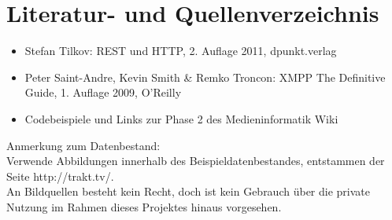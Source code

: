 

\chapter{Literatur- und Quellenverzeichnis}
\begin{itemize}
\item
Stefan Tilkov: REST und HTTP, 2. Auflage 2011, dpunkt.verlag
\item
Peter Saint-Andre, Kevin Smith \& Remko Troncon: XMPP The Definitive Guide, 1. Auflage 2009, O'Reilly
\item
Codebeispiele und Links zur Phase 2 des Medieninformatik Wiki
\end{itemize}

Anmerkung zum Datenbestand:\\
Verwende Abbildungen innerhalb des Beispieldatenbestandes, entstammen der Seite http://trakt.tv/.\\
An Bildquellen besteht kein Recht, doch ist kein Gebrauch über die private Nutzung im Rahmen dieses Projektes hinaus vorgesehen.

\newpage
